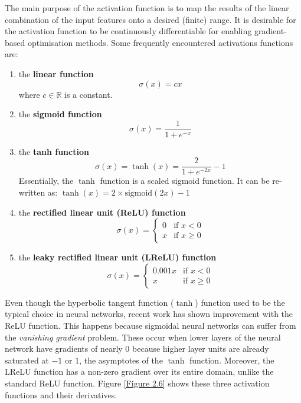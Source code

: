 	The main purpose of the activation function is to map the results of the linear combination of the input features onto a desired (finite) range. It is desirable for the activation function to be continuously differentiable for enabling gradient-based optimisation methods. Some frequently encountered activations functions are:
	\begin{enumerate}
		\item the \textbf{linear function}
					\begin{equation}
						\sigma(x) = cx 
					\end{equation}
				where $c \in \mathbb{R}$ is a constant. 
		
		\item the \textbf{sigmoid function}
					\begin{equation}
						\sigma(x) = \frac{1}{1+e^{-x}}
 					\end{equation}
 					
	 	\item the \textbf{tanh function}
				 	\begin{equation}
					 	\sigma(x) = \tanh(x) = \frac{2}{1+e^{-2x}} - 1
				 	\end{equation}
					Essentially, the $\tanh$ function is a scaled sigmoid function. It can be re-written as: $\tanh(x) = 2 \times \text{sigmoid}(2x) - 1$ 
					
		\item the \textbf{rectified linear unit (ReLU) function}
					\begin{equation}
						\sigma(x) = 
							\begin{cases}
								0 & \text{if } x < 0 \\
								x & \text{if } x \geq 0
							\end{cases}
					\end{equation}
		
		\item the \textbf{leaky rectified linear unit (LReLU) function}
					\begin{equation}
						\sigma(x) = 
						\begin{cases}
							0.001x & \text{if } x < 0 \\
							x & \text{if } x \geq 0
					\end{cases}
					\end{equation}
	\end{enumerate} 
 
	Even though the hyperbolic tangent function ($\tanh$) function used to be the typical choice in neural networks, recent work has shown improvement with the ReLU function. This happens because sigmoidal neural networks can suffer from the \textit{vanishing gradient} problem. These occur when lower layers of the neural network have gradients of nearly 0 because higher layer units are already saturated at $-1$ or $1$, the asymptotes of the $\tanh$ function. Moreover, the LReLU function has a non-zero gradient over its entire domain, unlike the standard ReLU function. Figure \ref{Figure 2.6} shows these three activation functions and their derivatives.
	
